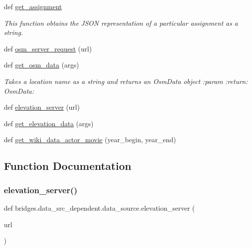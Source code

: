 \begin{DoxyCompactItemize}
def \hyperlink{namespacebridges_1_1data__src__dependent_1_1data__source_add1ea37030fe616297d99cfdf4ae890d}{get\+\_\+assignment}
\begin{DoxyCompactList}\small\item\em This function obtains the J\+S\+ON representation of a particular assignment as a string. \end{DoxyCompactList}\item 
def \hyperlink{namespacebridges_1_1data__src__dependent_1_1data__source_a5644517c9ee0f5ab9e59a4f4d64fa038}{osm\+\_\+server\+\_\+request} (url)
\item 
def \hyperlink{namespacebridges_1_1data__src__dependent_1_1data__source_acbb9052453e120b99ac32b27fd99bb07}{get\+\_\+osm\+\_\+data} (args)
\begin{DoxyCompactList}\small\item\em Takes a location name as a string and returns an Osm\+Data object \+:param \+:return\+: Osm\+Data\+: \end{DoxyCompactList}\item 
def \hyperlink{namespacebridges_1_1data__src__dependent_1_1data__source_a5232b70889e93385e68a7cd1b296123e}{elevation\+\_\+server} (url)
\item 
def \hyperlink{namespacebridges_1_1data__src__dependent_1_1data__source_a5193a0d8e1507b1cedb5de65f1d702bd}{get\+\_\+elevation\+\_\+data} (args)
\item 
def \hyperlink{namespacebridges_1_1data__src__dependent_1_1data__source_a15db0d52db8b6e096db60f99b2f0171d}{get\+\_\+wiki\+\_\+data\+\_\+actor\+\_\+movie} (year\+\_\+begin, year\+\_\+end)
\end{DoxyCompactItemize}


\subsection{Function Documentation}
\mbox{\label{namespacebridges_1_1data__src__dependent_1_1data__source_a5232b70889e93385e68a7cd1b296123e}} 
\subsubsection{\texorpdfstring{elevation\+\_\+server()}{elevation\_server()}}
{\footnotesize\ttfamily def bridges.\+data\+\_\+src\+\_\+dependent.\+data\+\_\+source.\+elevation\+\_\+server (\begin{DoxyParamCaption}\item[{}]{url }\end{DoxyParamCaption})}

